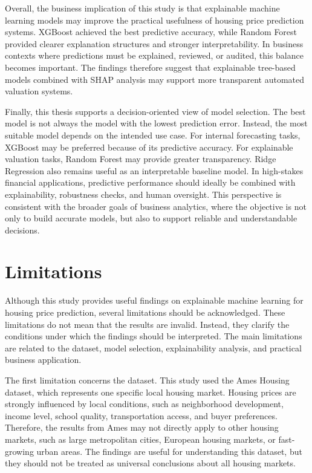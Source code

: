 \documentclass[12pt,a4paper,oneside,openany]{book}
\begin{document}
Overall, the business implication of this study is that explainable machine learning models may improve the practical usefulness of housing price prediction systems. XGBoost achieved the best predictive accuracy, while Random Forest provided clearer explanation structures and stronger interpretability. In business contexts where predictions must be explained, reviewed, or audited, this balance becomes important. The findings therefore suggest that explainable tree-based models combined with SHAP analysis may support more transparent automated valuation systems.

Finally, this thesis supports a decision-oriented view of model selection. The best model is not always the model with the lowest prediction error. Instead, the most suitable model depends on the intended use case. For internal forecasting tasks, XGBoost may be preferred because of its predictive accuracy. For explainable valuation tasks, Random Forest may provide greater transparency. Ridge Regression also remains useful as an interpretable baseline model. In high-stakes financial applications, predictive performance should ideally be combined with explainability, robustness checks, and human oversight. This perspective is consistent with the broader goals of business analytics, where the objective is not only to build accurate models, but also to support reliable and understandable decisions.


\section{Limitations}

Although this study provides useful findings on explainable machine learning for housing price prediction, several limitations should be acknowledged. These limitations do not mean that the results are invalid. Instead, they clarify the conditions under which the findings should be interpreted. The main limitations are related to the dataset, model selection, explainability analysis, and practical business application.

The first limitation concerns the dataset. This study used the Ames Housing dataset, which represents one specific local housing market. Housing prices are strongly influenced by local conditions, such as neighborhood development, income level, school quality, transportation access, and buyer preferences. Therefore, the results from Ames may not directly apply to other housing markets, such as large metropolitan cities, European housing markets, or fast-growing urban areas. The findings are useful for understanding this dataset, but they should not be treated as universal conclusions about all housing markets.
\end{document}

